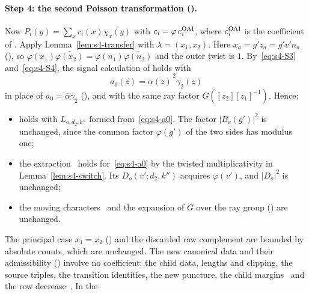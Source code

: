 \documentclass[11pt]{article}
\numberwithin{equation}{section}
\begin{document}
\paragraph{Step 4: the second Poisson transformation (\cite[proof of Lemma~17.2, \emph{The second Poisson transformation}]{OAI78}).} Now $P_i(y)=\sum_xc_i(x)\overline{\chi_x(y)}$
with $c_i=\varphi\,c_i^{\rm OAI}$, where $c_i^{\rm OAI}$ is the coefficient of \cite[proof of Lemma~17.2, \emph{The second Poisson transformation}]{OAI78}. Apply
Lemma~\ref{lem:s4-transfer} with $\lambda=(x_1,x_2)$. Here $x_a=g'z_a=g'v'n_a$ (\cite[proof of Lemma~17.2, \emph{The second Poisson transformation}]{OAI78}), so
$\varphi(x_1)\overline{\varphi(x_2)}=\varphi(n_1)\overline{\varphi(n_2)}$ and the outer twist is $1$. By~\eqref{eq:s4-S3}
and~\eqref{eq:s4-S4}, the signal calculation of \cite[proof of Lemma~17.2, \emph{The second Poisson transformation}]{OAI78} holds with
\begin{equation}\label{eq:s4-a0}
 a_0(z)=\overline{\alpha(z)}^{\,2}\gamma_2(z)
\end{equation}
in place of $a_0=\overline\alpha\gamma_2$ (\cite[proof of Lemma~17.2, \emph{The second Poisson transformation}]{OAI78}), and with the same ray factor $G([z_2][z_1]^{-1})$. Hence:
\begin{itemize}
\item \cite[eq.~(17.41)]{OAI78} holds with $L_{o,d_2,k''}$ formed
 from~\eqref{eq:s4-a0}. The factor $|B_o(g')|^2$ is unchanged, since the common factor $\varphi(g')$ of the two sides
 has modulus one;
\item the extraction~\cite[eq.~(17.42)]{OAI78} holds for~\eqref{eq:s4-a0} by the twisted
 multiplicativity in Lemma~\ref{lem:s4-switch}. Its $D_o(v';d_2,k'')$ acquires $\varphi(v')$, and $|D_o|^2$ is unchanged;
\item the moving characters~\cite[eq.~(17.43)]{OAI78} and the expansion of $G$ over the ray group
 (\cite[proof of Lemma~17.2, \emph{The second Poisson transformation}]{OAI78}) are unchanged.
\end{itemize}
The principal case $x_1=x_2$ (\cite[proof of Lemma~17.2, \emph{The second Poisson transformation}]{OAI78}) and the discarded raw complement are bounded by absolute counts,
which are unchanged.
The new canonical data and their admissibility (\cite[proof of Lemma~17.2, \emph{The new canonical data and their admissibility}]{OAI78}) involve no coefficient: the child data, lengths
and clipping, the source triples, the transition identities, the new puncture, the child
margins~\cite[eq.~(17.51)]{OAI78} and the row decrease~\cite[eq.~(17.52)]{OAI78}. In the
\end{document}
